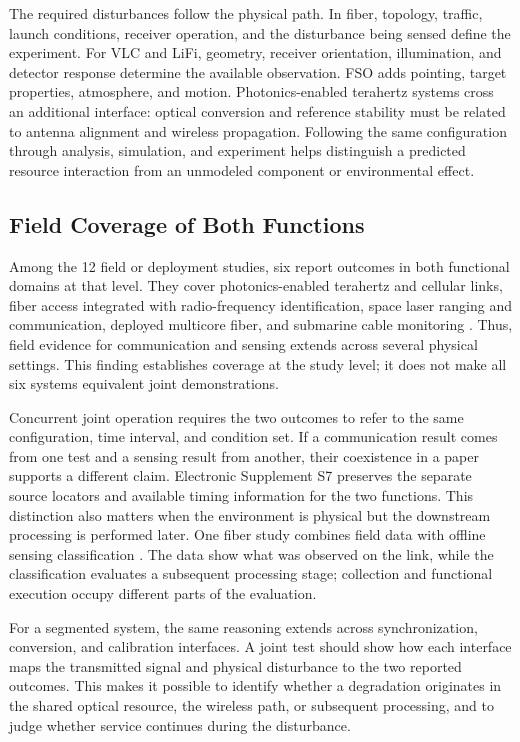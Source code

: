 The required disturbances follow the physical path. In fiber, topology,
traffic, launch conditions, receiver operation, and the disturbance being
sensed define the experiment. For VLC and LiFi, geometry, receiver orientation,
illumination, and detector response determine the available observation. FSO
adds pointing, target properties, atmosphere, and motion. Photonics-enabled
terahertz systems cross an additional interface: optical conversion and
reference stability must be related to antenna alignment and wireless
propagation. Following the same configuration through analysis, simulation,
and experiment helps distinguish a predicted resource interaction from an
unmodeled component or environmental effect.

\subsection{Field Coverage of Both Functions}

Among the 12 field or deployment studies, six report outcomes in both
functional domains at that level. They cover photonics-enabled terahertz and
cellular links, fiber access integrated with radio-frequency identification,
space laser ranging and communication, deployed multicore fiber, and submarine
cable monitoring
\cite{OISAC_SCR01054,OISAC_SCR00496,OISAC_SCR00631,OISAC_SCR00730,OISAC_SCR01086,OISAC_SCR00957}.
Thus, field evidence for communication and sensing extends across several
physical settings. This finding establishes coverage at the study level; it
does not make all six systems equivalent joint demonstrations.

Concurrent joint operation requires the two outcomes to refer to the same
configuration, time interval, and condition set. If a communication result
comes from one test and a sensing result from another, their coexistence in a
paper supports a different claim. Electronic Supplement S7 preserves the
separate source locators and available timing information for the two
functions. This distinction also matters when the environment is physical but
the downstream processing is performed later. One fiber study combines field
data with offline sensing classification \cite{OISAC_SCR01006}. The data show
what was observed on the link, while the classification evaluates a subsequent
processing stage; collection and functional execution occupy different parts
of the evaluation.

For a segmented system, the same reasoning extends across synchronization,
conversion, and calibration interfaces. A joint test should show how each
interface maps the transmitted signal and physical disturbance to the two
reported outcomes. This makes it possible to identify whether a degradation
originates in the shared optical resource, the wireless path, or subsequent
processing, and to judge whether service continues during the disturbance.

